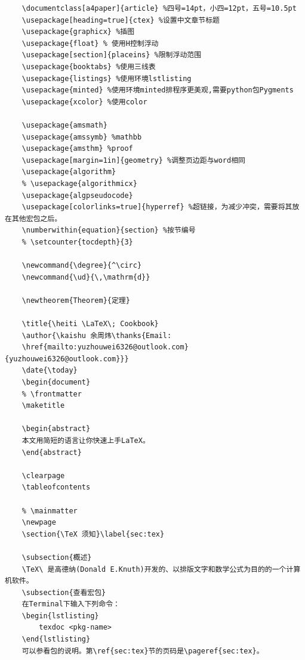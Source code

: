 \documentclass[a4paper]{article} %
\numberwithin{equation}{section} %
\newcommand{\degree}{^\circ}
\newcommand{\ud}{\,\mathrm{d}}
\begin{document}
\begin{verbatim}
    \documentclass[a4paper]{article} %四号=14pt，小四=12pt，五号=10.5pt
    \usepackage[heading=true]{ctex} %设置中文章节标题
    \usepackage{graphicx} %插图
    \usepackage{float} % 使用H控制浮动
    \usepackage[section]{placeins} %限制浮动范围
    \usepackage{booktabs} %使用三线表
    \usepackage{listings} %使用环境lstlisting
    \usepackage{minted} %使用环境minted排程序更美观,需要python包Pygments
    \usepackage{xcolor} %使用color
    
    \usepackage{amsmath}
    \usepackage{amssymb} %mathbb
    \usepackage{amsthm} %proof
    \usepackage[margin=1in]{geometry} %调整页边距与word相同
    \usepackage{algorithm}
    % \usepackage{algorithmicx}
    \usepackage{algpseudocode}
    \usepackage[colorlinks=true]{hyperref} %超链接，为减少冲突，需要将其放在其他宏包之后。
    \numberwithin{equation}{section} %按节编号
    % \setcounter{tocdepth}{3}
    
    \newcommand{\degree}{^\circ}
    \newcommand{\ud}{\,\mathrm{d}}
    
    \newtheorem{Theorem}{定理}
    
    \title{\heiti \LaTeX\; Cookbook}
    \author{\kaishu 余周炜\thanks{Email: 
    \href{mailto:yuzhouwei6326@outlook.com}{yuzhouwei6326@outlook.com}}}
    \date{\today}
    \begin{document}
    % \frontmatter
    \maketitle
    
    \begin{abstract}
    本文用简短的语言让你快速上手LaTeX。
    \end{abstract}
    
    \clearpage
    \tableofcontents
    
    % \mainmatter
    \newpage
    \section{\TeX 须知}\label{sec:tex}
    
    \subsection{概述}
    \TeX\ 是高德纳(Donald E.Knuth)开发的、以排版文字和数学公式为目的的一个计算机软件。
    \subsection{查看宏包}
    在Terminal下输入下列命令：
    \begin{lstlisting}
        texdoc <pkg-name>
    \end{lstlisting} 
    可以参看包的说明。第\ref{sec:tex}节的页码是\pageref{sec:tex}。
    

\end{verbatim}
\end{document}
